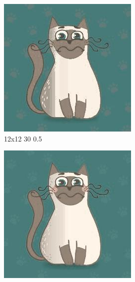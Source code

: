 \documentclass[12pt,a4paper]{article}
\begin{document}
\begin{figure}[htb]
\medskip
\begin{subfigure}{0.25\textwidth}
  \includegraphics[width=\linewidth]{images/cartoon/12-12-30-05}
  \caption{12x12 30 0.5}
  \label{fig:6}
\end{subfigure}
\begin{subfigure}{0.25\textwidth}
  \includegraphics[width=\linewidth]{images/cartoon/16-16-30-05}

\end{subfigure}
\end{figure}
\end{document}
